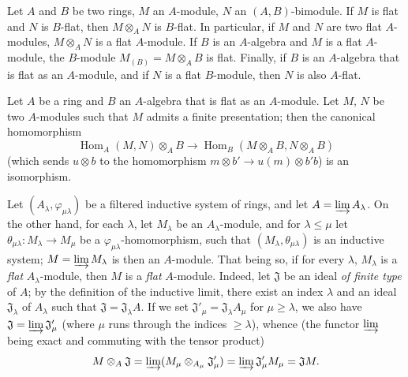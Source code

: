 \begin{env}[6.2.1]
\label{0.6.2.1}
Let $A$ and $B$ be two rings, $M$ an $A$-module, $N$ an
$(A,B)$-bimodule. If $M$ is flat and $N$ is $B$-flat, then
$M\otimes_A N$ is $B$-flat. In particular, if $M$ and $N$ are two
flat $A$-modules, $M\otimes_A N$ is a flat $A$-module. If $B$ is an
$A$-algebra and $M$ is
a flat $A$-module, the $B$-module $M_{(B)}=M\otimes_A B$ is flat. Finally, if
$B$ is an $A$-algebra that is flat as an $A$-module, and if $N$ is
a flat $B$-module, then $N$ is also $A$-flat.
\end{env}

\begin{env}[6.2.2]
\label{0.6.2.2}
Let $A$ be a ring and $B$ an $A$-algebra that is flat as an $A$-module.
Let $M$, $N$ be two $A$-modules such that $M$ admits a finite
presentation; then the canonical homomorphism
\[
  \operatorname{Hom}_A(M,N)\otimes_A B
  \longrightarrow
  \operatorname{Hom}_B(M\otimes_A B,N\otimes_A B)
  \tag{6.2.2.1}\label{0.6.2.2.1}
\]
(which sends $u\otimes b$ to the homomorphism
$m\otimes b'\to u(m)\otimes b'b$) is an isomorphism.
\end{env}

\begin{env}[6.2.3]
\label{0.6.2.3}
Let $(A_\lambda,\varphi_{\mu\lambda})$ be a filtered inductive system
of rings, and let $A=\varinjlim A_\lambda$. On the other hand, for each
$\lambda$, let $M_\lambda$ be an $A_\lambda$-module, and for $\lambda\leq\mu$ let
$\theta_{\mu\lambda}:M_\lambda\to M_\mu$ be a
$\varphi_{\mu\lambda}$-homomorphism, such that
$(M_\lambda,\theta_{\mu\lambda})$ is an inductive system;
$M=\varinjlim M_\lambda$ is then an $A$-module. That being so, if for every
$\lambda$, $M_\lambda$ is a \emph{flat} $A_\lambda$-module, then $M$ is
a \emph{flat} $A$-module. Indeed, let $\mathfrak{J}$ be an ideal \emph{of
finite type} of $A$; by the definition of the inductive limit, there exist an
index $\lambda$ and an ideal $\mathfrak{J}_\lambda$ of $A_\lambda$ such that
$\mathfrak{J}=\mathfrak{J}_\lambda A$. If we set
$\mathfrak{J}'_\mu=\mathfrak{J}_\lambda A_\mu$ for $\mu\geq\lambda$, we
also have $\mathfrak{J}=\varinjlim\mathfrak{J}'_\mu$ (where $\mu$ runs through the
indices $\geq\lambda$), whence (the functor $\varinjlim$ being exact and
commuting with the tensor product)
\[
  M\otimes_A\mathfrak{J}
  =\varinjlim(M_\mu\otimes_{A_\mu}\mathfrak{J}'_\mu)
  =\varinjlim\mathfrak{J}'_\mu M_\mu
  =\mathfrak{J}M.
\]
\end{env}

